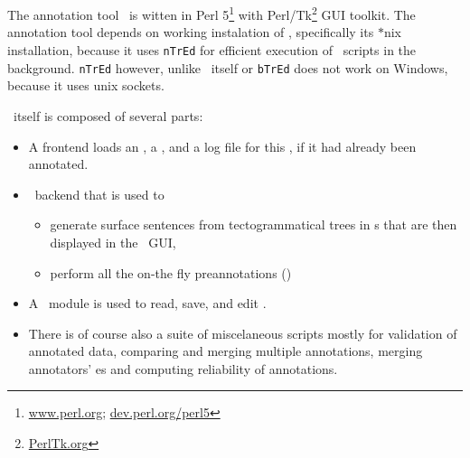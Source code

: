 \section{\seman}
\label{sec:seman}
The annotation tool \seman\ is witten in Perl 5\footnote{\url{www.perl.org}; \url{dev.perl.org/perl5}} with Perl/Tk\footnote{\url{PerlTk.org}} GUI toolkit. The annotation tool depends on working instalation of \tred, specifically its $\ast$nix installation, because it uses \texttt{nTrEd} for efficient execution of \tred\ scripts in the background. \texttt{nTrEd} however, unlike \tred\ itself or \texttt{bTrEd} does not work on Windows, because it uses unix sockets.

 \seman\ itself is composed of several parts:
\begin{itemize}
\item A frontend loads an \sf, a \semlex,  and a log file for this \sf, if it had already been annotated. 
\item \ntred\ backend that is used to 
	\begin{itemize}
	\item generate surface sentences from tectogrammatical trees in \tf{}s that are then displayed in the \seman\ GUI,
	\item perform all the on-the fly preannotations ()
	\end{itemize}
\item A \semlex\ module is used to read, save, and edit \semlex.
\item There is of course also a suite of miscelaneous scripts mostly for validation of annotated data, comparing and merging multiple annotations, merging annotators' \semlex{}es and computing reliability of annotations.
\end{itemize}

